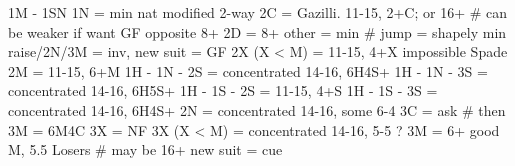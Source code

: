 1M - 1SN
1N = min nat
    modified 2-way
2C = Gazilli. 11-15, 2+C; or 16+  # can be weaker if want GF opposite 8+
    2D = 8+
    other = min  # jump = shapely min
        raise/2N/3M = inv, new suit = GF
2X (X < M) = 11-15, 4+X
    impossible Spade
2M = 11-15, 6+M
1H - 1N - 2S = concentrated 14-16, 6H4S+
1H - 1N - 3S = concentrated 14-16, 6H5S+
1H - 1S - 2S = 11-15, 4+S
1H - 1S - 3S = concentrated 14-16, 6H4S+
2N = concentrated 14-16, some 6-4
    3C = ask  # then 3M = 6M4C
    3X = NF
3X (X < M) = concentrated 14-16, 5-5
    ?
3M = 6+ good M, 5.5 Losers  # may be 16+
    new suit = cue